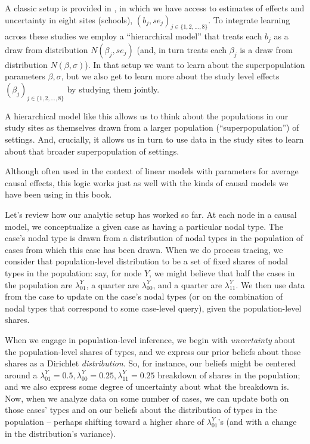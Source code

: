 \documentclass[
  12pt,
]{book}
\begin{document}
A classic setup is provided in \citet{gelman2013bayesian}, in which we have access to estimates of effects and uncertainty in eight sites (schools), \((b_j, se_j)_{j \in \{1,2,\dots,8\}}\). To integrate learning across these studies we employ a ``hierarchical model''
that treats each \(b_j\) as a draw from distribution \(N(\beta_j, se_j)\) (and, in turn treats each \(\beta_j\) is a draw from distribution \(N(\beta, \sigma)\)). In that setup we want to learn about the superpopulation parameters \(\beta, \sigma\), but we also get to learn more about the study level effects \((\beta_j)_{j \in \{1,2,\dots,8\}}\) by studying them jointly.

A hierarchical model like this allows us to think about the populations in our study sites as themselves drawn from a larger population (``superpopulation'') of settings. And, crucially, it allows us in turn to use data in the study sites to learn about that broader superpopulation of settings.

Although often used in the context of linear models with parameters for average causal effects, this logic works just as well with the kinds of causal models we have been using in this book.

Let's review how our analytic setup has worked so far. At each node in a causal model, we conceptualize a given case as having a particular nodal type. The case's nodal type is drawn from a distribution of nodal types in the population of cases from which this case has been drawn. When we do process tracing, we consider that population-level distribution to be a set of fixed shares of nodal types in the population: say, for node \(Y\), we might believe that half the cases in the population are \(\lambda^Y_{01}\), a quarter are \(\lambda^Y_{00}\), and a quarter are \(\lambda^Y_{11}\). We then use data from the case to update on the case's nodal types (or on the combination of nodal types that correspond to some case-level query), given the population-level shares.

When we engage in population-level inference, we begin with \emph{uncertainty} about the population-level shares of types, and we express our prior beliefs about those shares as a Dirichlet \emph{distribution}. So, for instance, our beliefs might be centered around a \(\lambda^Y_{01}=0.5, \lambda^Y_{00}=0.25, \lambda^Y_{11}=0.25\) breakdown of shares in the population; and we also express some degree of uncertainty about what the breakdown is. Now, when we analyze data on some number of cases, we can update both on those cases' types and on our beliefs about the distribution of types in the population -- perhaps shifting toward a higher share of \(\lambda^Y_{01}\)'s (and with a change in the distribution's variance).
\end{document}
